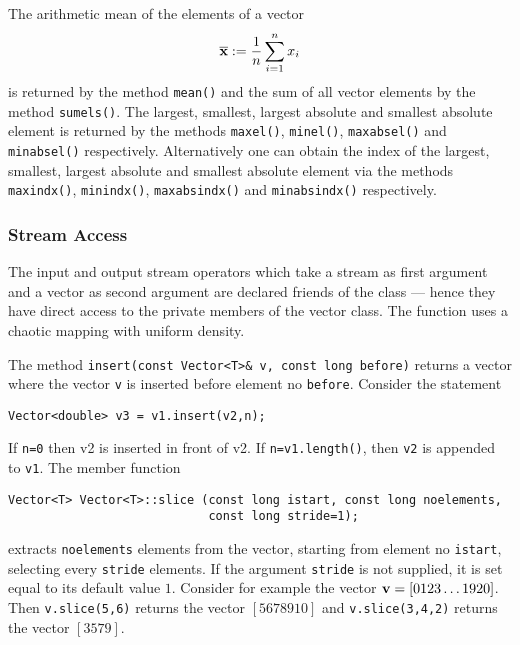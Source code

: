 The arithmetic mean of the elements of a vector 
\begin{eqnarray}
  \overline{\bf x} := \frac{1}{n} \sum_{i=1}^n x_i  
\end{eqnarray}
is returned by the method \verb+mean()+ and the sum of all vector elements
by the method \verb+sumels()+. The largest, smallest, largest absolute and
smallest absolute element is returned by the methods \verb+maxel()+,
\verb+minel()+, \verb+maxabsel()+ and \verb+minabsel()+ respectively.
Alternatively one can obtain the index of the largest, smallest, largest absolute and
smallest absolute element via the methods \verb+maxindx()+,
\verb+minindx()+, \verb+maxabsindx()+ and \verb+minabsindx()+ respectively.


\subsubsection{Stream Access}

The input and output stream operators which take a stream as first 
argument and a vector as second argument are declared friends of 
the class --- hence they have direct access to the private members of 
the vector class. The function uses a chaotic mapping with uniform 
density.

The method \verb+insert(const Vector<T>& v, const long before)+ 
returns a vector where the vector \verb+v+ is inserted before 
element no \verb+before+. Consider the statement
{\footnotesize \begin{verbatim}
Vector<double> v3 = v1.insert(v2,n);
\end{verbatim}}
\noindent
If \verb+n=0+ then v2 is inserted in front of v2. If \verb+n=v1.length()+, 
then \verb+v2+ is appended to \verb+v1+.
The member function 
{\footnotesize \begin{verbatim}
Vector<T> Vector<T>::slice (const long istart, const long noelements,
                            const long stride=1);
\end{verbatim}}
extracts \verb+noelements+ elements from the vector, starting
from element no \verb+istart+, selecting every \verb+stride+
elements. If the argument \verb+stride+ is not supplied, it is 
set equal to its default value $1$. Consider for example the 
vector ${\bf v} = [0 1 2 3 \dots 19 20]$.
Then \verb+v.slice(5,6)+ returns the vector $[5 6 7 8 9 10]$ and
\verb+v.slice(3,4,2)+ returns the vector $[3 5 7 9]$.

